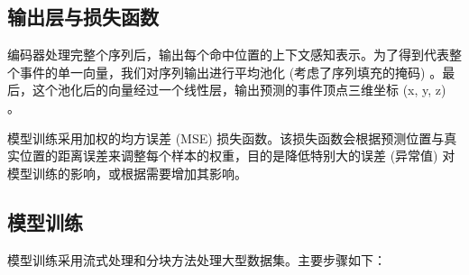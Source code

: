 \subsection{输出层与损失函数}
编码器处理完整个序列后，输出每个命中位置的上下文感知表示。为了得到代表整个事件的单一向量，我们对序列输出进行平均池化 (考虑了序列填充的掩码) 。最后，这个池化后的向量经过一个线性层，输出预测的事件顶点三维坐标 (x, y, z) 。

模型训练采用加权的均方误差 (MSE) 损失函数。该损失函数会根据预测位置与真实位置的距离误差来调整每个样本的权重，目的是降低特别大的误差 (异常值) 对模型训练的影响，或根据需要增加其影响。

\subsection{模型训练}

模型训练采用流式处理和分块方法处理大型数据集。主要步骤如下：

